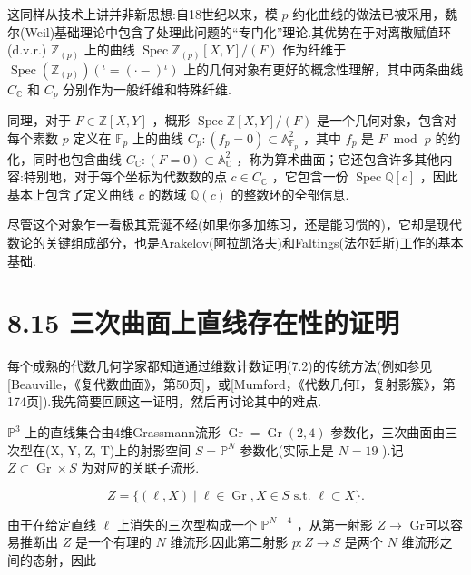 这同样从技术上讲并非新思想:自18世纪以来，模 \(p\) 约化曲线的做法已被采用，魏尔(Weil)基础理论中包含了处理此问题的“专门化”理论.其优势在于对离散赋值环(d.v.r.) \({\mathbb{Z}}_{\left( p\right) }\) 上的曲线 \(\operatorname{Spec}{\mathbb{Z}}_{\left( p\right) }\left\lbrack  {X,Y}\right\rbrack  /\left( F\right)\) 作为纤维于 \(\operatorname{Spec}\left( {\mathbb{Z}}_{\left( p\right) }\right) \left( {{}^{\iota } = \left( {\cdot  - }\right) {}^{\iota }}\right)\) 上的几何对象有更好的概念性理解，其中两条曲线 \({C}_{\mathbb{C}}\) 和 \({C}_{p}\) 分别作为一般纤维和特殊纤维.

同理，对于 \(F \in  \mathbb{Z}\left\lbrack  {X,Y}\right\rbrack\) ，概形 \(\operatorname{Spec}\mathbb{Z}\left\lbrack  {X,Y}\right\rbrack  /\left( F\right)\) 是一个几何对象，包含对每个素数 \(p\) 定义在 \({\mathbb{F}}_{p}\) 上的曲线 \({C}_{p} : \left( {{f}_{p} = 0}\right)  \subset  {\mathbb{A}}_{{\mathbb{F}}_{p}}^{2}\) ，其中 \({f}_{p}\) 是 \(F{\;\operatorname{mod}\;p}\) 的约化，同时也包含曲线 \({C}_{\mathbb{C}} : \left( {F = 0}\right)  \subset  {\mathbb{A}}_{\mathbb{C}}^{2}\) ，称为算术曲面；它还包含许多其他内容:特别地，对于每个坐标为代数数的点 \(c \in  {C}_{\mathbb{C}}\) ，它包含一份 \(\operatorname{Spec}\mathbb{Q}\left\lbrack  c\right\rbrack\) ，因此基本上包含了定义曲线 \(c\) 的数域 \(\mathbb{Q}\left( c\right)\) 的整数环的全部信息.

尽管这个对象乍一看极其荒诞不经(如果你多加练习，还是能习惯的)，它却是现代数论的关键组成部分，也是Arakelov(阿拉凯洛夫)和Faltings(法尔廷斯)工作的基本基础.

\section{8.15 三次曲面上直线存在性的证明}

每个成熟的代数几何学家都知道通过维数计数证明(7.2)的传统方法(例如参见[Beauville，《复代数曲面》，第50页]，或[Mumford，《代数几何I，复射影簇》，第174页]).我先简要回顾这一证明，然后再讨论其中的难点.

\({\mathbb{P}}^{3}\) 上的直线集合由4维Grassmann流形 \(\operatorname{Gr} = \operatorname{Gr}\left( {2,4}\right)\) 参数化，三次曲面由三次型在(X, Y, Z, T)上的射影空间 \(S = {\mathbb{P}}^{N}\) 参数化(实际上是 \(N = {19}\) ).记 \(Z \subset  \operatorname{Gr} \times  S\) 为对应的关联子流形.

\[
Z = \{ \left( {\ell ,X}\right)  \mid  \ell  \in  \operatorname{Gr},X \in  S\text{ s.t. }\ell  \subset  X\} .
\]

由于在给定直线 \(\ell\) 上消失的三次型构成一个 \({\mathbb{P}}^{N - 4}\) ，从第一射影 \(Z \rightarrow\) Gr可以容易推断出 \(Z\) 是一个有理的 \(N\) 维流形.因此第二射影 \(p : Z \rightarrow  S\) 是两个 \(N\) 维流形之间的态射，因此


